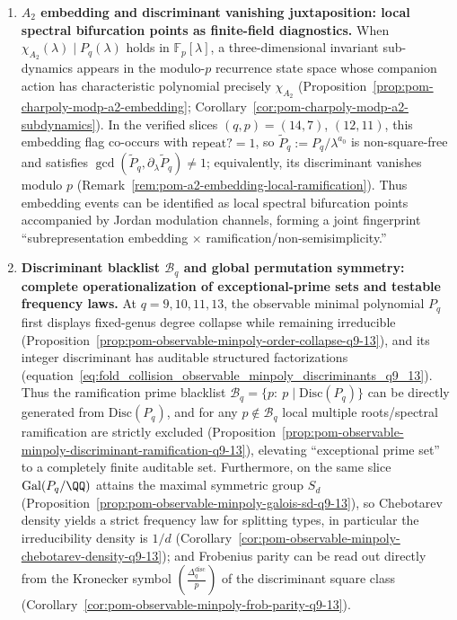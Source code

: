 \begin{enumerate}
  \item \textbf{\texorpdfstring{$A_2$}{A2} embedding and discriminant vanishing juxtaposition: local spectral bifurcation points as finite-field diagnostics.}
  When \(\chi_{A_2}(\lambda)\mid P_q(\lambda)\) holds in \(\mathbb{F}_p[\lambda]\), a three-dimensional invariant sub-dynamics appears in the modulo-\(p\) recurrence state space whose companion action has characteristic polynomial precisely \(\chi_{A_2}\) (Proposition~\ref{prop:pom-charpoly-modp-a2-embedding}; Corollary~\ref{cor:pom-charpoly-modp-a2-subdynamics}).
  In the verified slices \((q,p)=(14,7)\), \((12,11)\), this embedding flag co-occurs with \(\mathrm{repeat?}=1\), so \(\widetilde P_q:=P_q/\lambda^{a_0}\) is non-square-free and satisfies \(\gcd(\widetilde P_q,\partial_\lambda\widetilde P_q)\neq 1\); equivalently, its discriminant vanishes modulo \(p\) (Remark~\ref{rem:pom-a2-embedding-local-ramification}).
  Thus embedding events can be identified as local spectral bifurcation points accompanied by Jordan modulation channels, forming a joint fingerprint ``subrepresentation embedding \(\times\) ramification/non-semisimplicity.''

  \item \textbf{Discriminant blacklist \texorpdfstring{$\mathcal{B}_q$}{Bq} and global permutation symmetry: complete operationalization of exceptional-prime sets and testable frequency laws.}
  At \(q=9,10,11,13\), the observable minimal polynomial \(P_q\) first displays fixed-genus degree collapse while remaining irreducible (Proposition~\ref{prop:pom-observable-minpoly-order-collapse-q9-13}), and its integer discriminant has auditable structured factorizations (equation~\eqref{eq:fold_collision_observable_minpoly_discriminants_q9_13}).
  Thus the ramification prime blacklist
  \(\mathcal{B}_q=\{p:\ p\mid \mathrm{Disc}(P_q)\}\)
  can be directly generated from \(\mathrm{Disc}(P_q)\), and for any \(p\notin\mathcal{B}_q\) local multiple roots/spectral ramification are strictly excluded (Proposition~\ref{prop:pom-observable-minpoly-discriminant-ramification-q9-13}), elevating ``exceptional prime set'' to a completely finite auditable set.
  Furthermore, on the same slice \(\mathrm{Gal}(P_q/\QQ)\) attains the maximal symmetric group \(S_d\) (Proposition~\ref{prop:pom-observable-minpoly-galois-sd-q9-13}), so Chebotarev density yields a strict frequency law for splitting types, in particular the irreducibility density is \(1/d\) (Corollary~\ref{cor:pom-observable-minpoly-chebotarev-density-q9-13}); and Frobenius parity can be read out directly from the Kronecker symbol \(\left(\frac{\Delta_q^{\mathrm{disc}}}{p}\right)\) of the discriminant square class (Corollary~\ref{cor:pom-observable-minpoly-frob-parity-q9-13}).


\end{enumerate}
